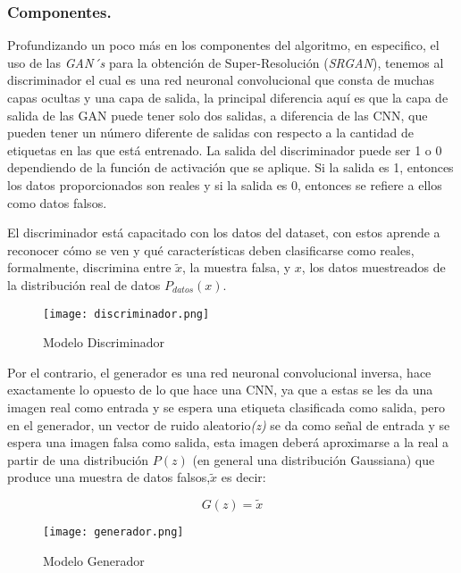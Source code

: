 \subsubsection{Componentes.}

Profundizando un poco más en los componentes del algoritmo, en especifico, el uso de las \emph{GAN´s} para la obtención de Super-Resolución (\emph{SRGAN}), 
tenemos al discriminador el cual es una red neuronal convolucional que consta de muchas 
capas ocultas y una capa de salida, la principal diferencia aquí es que la capa de salida de las GAN puede tener solo dos salidas, 
a diferencia de las CNN, que pueden tener un número diferente de salidas con respecto a la cantidad de etiquetas en las que está entrenado.
La salida del discriminador puede ser 1 o 0 dependiendo de la función de activación que se aplique. Si la salida es 1, 
entonces los datos proporcionados son reales y si la salida es 0, entonces se refiere a ellos como datos falsos.

El discriminador está capacitado con los datos del dataset, con estos aprende a reconocer cómo se ven y qué características deben 
clasificarse como reales, formalmente, discrimina entre $\tilde{x}$, la muestra falsa, y $x$, 
los datos muestreados de la distribución real de datos $P_{datos}(x)$.




\begin{figure}[H]
    \begin{center}
      \texttt{[image: discriminador.png]}
      \caption{Modelo Discriminador}
      \label{Alexis2}
    \end{center}
\end{figure}


Por el contrario, el generador es una red neuronal convolucional inversa, hace exactamente lo opuesto de lo que hace una CNN, ya que 
a estas se les da una imagen real como entrada y se espera una etiqueta clasificada como salida, 
pero en el generador, un vector de ruido aleatorio\emph{(z)} se da como señal de entrada 
y se espera una imagen falsa como salida, esta imagen deberá aproximarse a la real a
partir de una distribución $P(z)$ (en general una distribución Gaussiana) que
produce una muestra de datos falsos,$\tilde{x}$ es decir:

\begin{equation}
G(z) = \tilde{x}
\end{equation}

\begin{figure}[H]
    \begin{center}
      \texttt{[image: generador.png]}
      \caption{Modelo Generador}
      \label{Alexis3}
    \end{center}
\end{figure}
    
